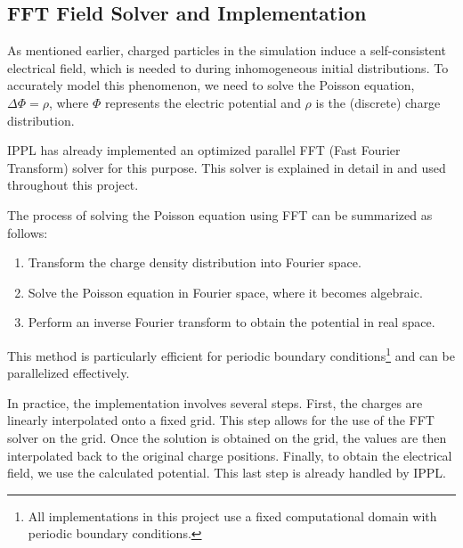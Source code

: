 \subsection{FFT Field Solver and Implementation}\label{sec:FieldSolverImplementation}

As mentioned earlier, charged particles in the simulation induce a self-consistent electrical field, which is needed to during inhomogeneous initial distributions. To accurately model this phenomenon, we need to solve the Poisson equation, $\Delta \Phi = \rho$, where $\Phi$ represents the electric potential and $\rho$ is the (discrete) charge distribution.

IPPL has already implemented an optimized parallel FFT (Fast Fourier Transform) solver for this purpose. This solver is explained in detail in \cite[2]{mayani2024massivelyparallelperformanceportable} and used throughout this project.

The process of solving the Poisson equation using FFT can be summarized as follows:
\begin{enumerate}
    \item Transform the charge density distribution into Fourier space.
    \item Solve the Poisson equation in Fourier space, where it becomes algebraic.
    \item Perform an inverse Fourier transform to obtain the potential in real space.
\end{enumerate}
This method is particularly efficient for periodic boundary conditions\footnote{All implementations in this project use a fixed computational domain with periodic boundary conditions.} and can be parallelized effectively. 

In practice, the implementation involves several steps. First, the charges are linearly interpolated onto a fixed grid. This step allows for the use of the FFT solver on the grid. Once the solution is obtained on the grid, the values are then interpolated back to the original charge positions. Finally, to obtain the electrical field, we use the calculated potential. This last step is already handled by IPPL.



